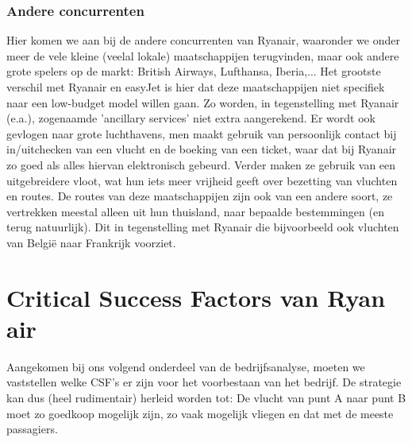 \documentclass{article}
\begin{document}
\section{Andere concurrenten}

Hier komen we aan bij de andere concurrenten van Ryanair, waaronder we onder meer de vele kleine (veelal lokale) maatschappijen terugvinden, maar ook andere grote spelers op de markt: British Airways, Lufthansa, Iberia,... 
Het grootste verschil met Ryanair en easyJet is hier dat deze maatschappijen niet specifiek naar een low-budget model willen gaan. Zo worden, in tegenstelling met Ryanair (e.a.), zogenaamde 'ancillary services' niet extra aangerekend. Er wordt ook gevlogen naar grote luchthavens, men maakt gebruik van persoonlijk contact bij in/uitchecken van een vlucht en de boeking van een ticket, waar dat bij Ryanair zo goed als alles hiervan elektronisch gebeurd. Verder maken ze gebruik van een uitgebreidere vloot, wat hun iets meer vrijheid geeft over bezetting van vluchten en routes.
De routes van deze maatschappijen zijn ook van een andere soort, ze vertrekken meestal alleen uit hun thuisland, naar bepaalde bestemmingen (en terug natuurlijk). Dit in tegenstelling met Ryanair die bijvoorbeeld ook vluchten van Belgi\"e naar Frankrijk voorziet.

\part{Critical Success Factors van Ryan air}

Aangekomen bij ons volgend onderdeel van de bedrijfsanalyse, moeten we vaststellen welke CSF's er zijn voor het voorbestaan van het bedrijf. De strategie kan dus (heel rudimentair) herleid worden tot: De vlucht van punt A naar punt B moet zo goedkoop mogelijk zijn, zo vaak mogelijk vliegen en dat met de meeste passagiers.
\end{document}
